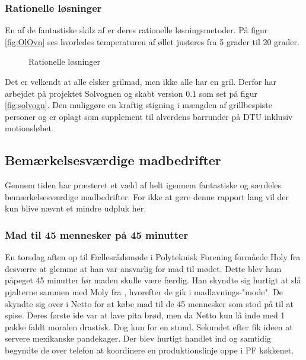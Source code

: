 \subsubsection{Rationelle løsninger}
En af de fantastiske skilz af \HM er deres rationelle løsningsmetoder. På figur \ref{fig:OlOvn} ses hvorledes temperaturen af øllet justeres fra 5 grader til 20 grader.\\

\begin{figure}[h]
\centering
{}
\caption{Rationelle løsninger}
\label{fig:rationelle}
\end{figure}

Det er velkendt at alle elsker grilmad, men ikke alle har en gril. Derfor har \HM arbejdet på projektet Solvognen og skabt version 0.1 som set på figur \ref{fig:solvogn}. Den muliggøre en kraftig stigning i mængden af grillbespiste personer og er oplagt som supplement til alverdens barrunder på DTU inklusiv motionsløbet.\\

\subsection{Bemærkelsesværdige madbedrifter}
Gennem tiden har \HM præsteret et væld af helt igennem fantastiske og særdeles bemærkelsesværdige madbedrifter. For ikke at gøre denne rapport lang vil der kun blive nævnt et mindre udpluk her.\\

\subsubsection{Mad til 45 mennesker på 45 minutter}
En torsdag aften op til Fællesrådsmøde i Polyteknisk Forening formåede Holy fra \HM desværre at glemme at han var ansvarlig for mad til mødet. Dette blev ham påpeget 45 minutter før maden skulle være færdig. Han skyndte sig hurtigt at slå pjalterne sammen med Moly fra \HM, hvorefter de gik i madlavnings-"mode". De skyndte sig over i Netto for at købe mad til de 45 mennesker som stod på til at spise. Deres første ide var at lave pita brød, men da Netto kun lå inde med 1 pakke faldt moralen drastisk. Dog kun for en stund. Sekundet efter fik \HM ideen at servere mexikanske pandekager. Der blev hurtigt handlet ind og samtidig begyndte de over telefon at koordinere en produktionslinje oppe i PF køkkenet.

